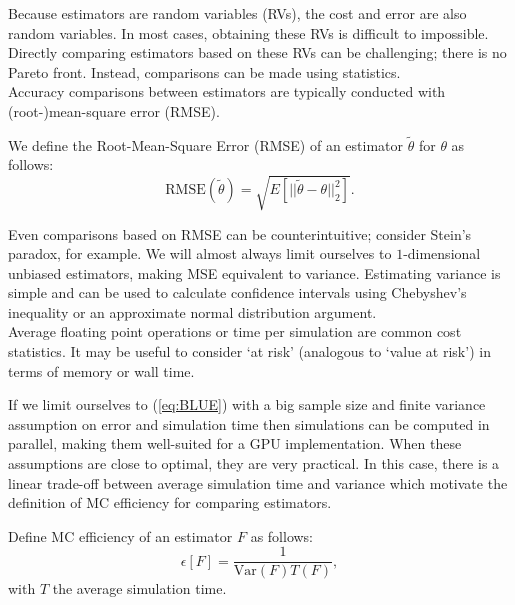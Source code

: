 \documentclass[a4paper,12pt]{article}
\begin{document}
Because estimators are random variables (RVs), the cost and error are also random
variables. In most cases, obtaining these RVs is difficult to impossible.
Directly comparing estimators based on these RVs can be challenging;
there is no Pareto front. Instead, comparisons can be made
using statistics. \\

Accuracy comparisons between estimators
are typically conducted with (root-)mean-square error (RMSE).
\begin{definition}
    We define the Root-Mean-Square Error (RMSE) of an estimator $\tilde{\theta}$ for $\theta$  as follows:
    \begin{equation}
        \text{RMSE}(\tilde{\theta}) = \sqrt{E[||\tilde{\theta}-\theta||^{2}_{2}]}.
    \end{equation}
\end{definition}

Even comparisons based on RMSE can be counterintuitive; consider Stein's paradox,
for example. We will almost always limit ourselves to $1$-dimensional
unbiased estimators, making MSE equivalent to variance.
Estimating variance is simple and can be used to calculate
confidence intervals using Chebyshev's inequality or an
approximate normal distribution argument.\\

Average floating point operations or time per simulation are common cost statistics.
It may be useful to consider \enquote*{at risk}  (analogous to \enquote*{value at risk})
in terms of memory or wall time.

If we limit ourselves to (\ref{eq:BLUE}) with a big sample size and
finite variance assumption on error and simulation time then
simulations can be computed in parallel, making them well-suited for a GPU implementation.
When these assumptions are close to optimal, they are very practical.
In this case, there is a linear trade-off
between average simulation time and variance which motivate
the definition of MC efficiency for comparing estimators.

\begin{definition}
    Define MC efficiency of an
    estimator $F$ as follows:
    \begin{equation}
        \epsilon[F]=\frac{1}{\text{Var}(F) T(F)},
    \end{equation}
    with $T$ the average simulation time.
\end{definition}
\end{document}

